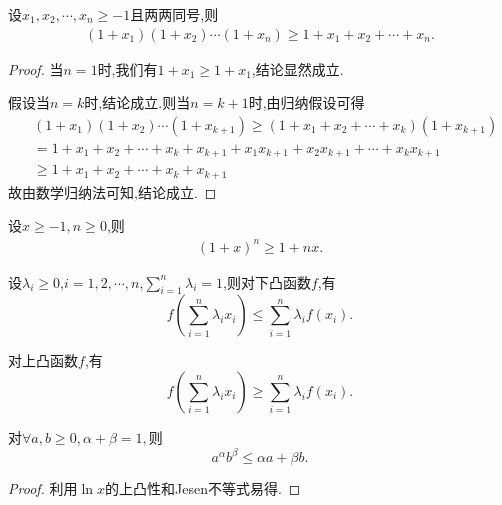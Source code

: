 \documentclass[../../main.tex]{subfiles}
\begin{document}
\begin{theorem}[Bernoulli不等式]\label{theorem:Bernoulli不等式}
设$x_1,x_2,\cdots,x_n\geqslant  -1$且两两同号,则
\begin{align*}
\left( 1+x_1 \right) \left( 1+x_2 \right) \cdots \left( 1+x_n \right) \geqslant 1+x_1+x_2+\cdots +x_n.
\end{align*}
\end{theorem}
\begin{proof}
当$n=1$时,我们有$1+x_1\geqslant  1+x_1$,结论显然成立.

假设当$n=k$时,结论成立.则当$n=k+1$时,由归纳假设可得
\begin{align*}
&\left( 1+x_1 \right) \left( 1+x_2 \right) \cdots \left( 1+x_{k+1} \right) \geqslant \left( 1+x_1+x_2+\cdots +x_k \right) \left( 1+x_{k+1} \right) 
\\
&=1+x_1+x_2+\cdots +x_k+x_{k+1}+x_1x_{k+1}+x_2x_{k+1}+\cdots +x_kx_{k+1}
\\
&\geqslant 1+x_1+x_2+\cdots +x_k+x_{k+1}
\end{align*}
故由数学归纳法可知,结论成立.

\end{proof}

\begin{theorem}[Bernoulli不等式特殊形式]\label{theorem:Bernoulli不等式特殊形式}
设$x\geqslant -1,n\geqslant  0$,则
\begin{align*}
(1+x)^n\geqslant1+nx.
\end{align*}
\end{theorem}

\begin{theorem}[Jesen不等式]\label{theorem:Jesen不等式}
设\(\lambda_i \geqslant  0\),\(i = 1,2,\cdots,n\),\(\sum\limits_{i = 1}^{n} \lambda_i = 1\),则对下凸函数\(f\),有
\[
f\left(\sum\limits_{i = 1}^{n} \lambda_i x_i\right) \leqslant  \sum\limits_{i = 1}^{n} \lambda_i f(x_i).
\]

对上凸函数\(f\),有
\[
f\left(\sum\limits_{i = 1}^{n} \lambda_i x_i\right) \geqslant  \sum\limits_{i = 1}^{n} \lambda_i f(x_i).
\]
\end{theorem}

\begin{corollary}
对$\forall a,b\geqslant 0,\alpha +\beta =1,$则
$$a^{\alpha}b^{\beta}\leqslant \alpha a+\beta b.$$
\end{corollary}
\begin{proof}
利用$\ln x$的上凸性和Jesen不等式易得.

\end{proof}
\end{document}

